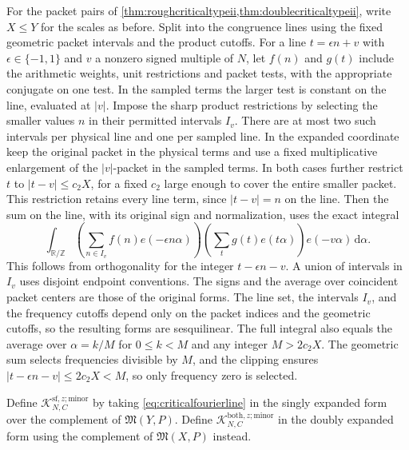 \documentclass[11pt,a4paper]{article}
\numberwithin{equation}{section}
\newcommand{\ud}{\mathrm d}
\begin{document}
For the packet pairs of \cref{thm:roughcriticaltypeii,thm:doublecriticaltypeii},
write $X\le Y$ for the scales as before. Split into the
congruence lines using the fixed geometric packet intervals
and the product cutoffs. For a line $t=\epsilon n+v$ with
$\epsilon\in\{-1,1\}$ and $v$ a nonzero signed multiple
of $N$, let $f(n)$ and $g(t)$ include the arithmetic
weights, unit restrictions and packet tests, with the
appropriate conjugate on one test. In the sampled terms
the larger test is constant on the line, evaluated at
$|v|$. Impose the sharp product restrictions by selecting
the smaller values $n$ in their permitted intervals $I_v$.
There are at most two such intervals per physical line
and one per sampled line. In the expanded coordinate
keep the original packet in the physical terms and use
a fixed multiplicative enlargement of the $|v|$-packet
in the sampled terms. In both cases further restrict $t$
to $|t-v|\le c_2 X$, for a fixed $c_2$ large enough to
cover the entire smaller packet. This restriction retains
every line term, since $|t-v|=n$ on the line. Then the
sum on the line, with its original sign and normalization,
uses the exact integral
\begin{equation}
 \int_{\mathbb R/\mathbb Z}
  \left(\sum_{n\in I_v} f(n)e(-\epsilon n\alpha)\right)
  \left(\sum_t g(t)e(t\alpha)\right)e(-v\alpha)\,\ud\alpha .
 \label{eq:criticalfourierline}
\end{equation}
This follows from orthogonality for the integer
$t-\epsilon n-v$. A union of intervals in $I_v$ uses
disjoint endpoint conventions. The signs and the average
over coincident packet centers are those of the original
forms. The line set, the intervals $I_v$, and the frequency
cutoffs depend only on the packet indices and the geometric
cutoffs, so the resulting forms are sesquilinear.
The full integral also equals the average over $\alpha=k/M$
for $0\le k<M$ and any integer $M>2c_2X$. The geometric
sum selects frequencies divisible by $M$, and the clipping
ensures $|t-\epsilon n-v|\le2c_2X<M$, so only frequency
zero is selected.

Define $\mathcal K^{\mathrm{sf},z;\mathrm{minor}}_{N,C}$
by taking \cref{eq:criticalfourierline} in the singly
expanded form over the complement of $\mathfrak M(Y,P)$.
Define $\mathcal K^{\mathrm{both},z;\mathrm{minor}}_{N,C}$
in the doubly expanded form using the complement of
$\mathfrak M(X,P)$ instead.
\end{document}
